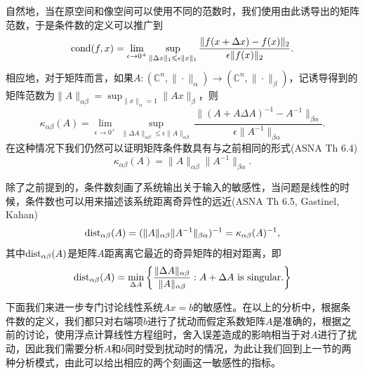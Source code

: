 \documentclass[a4paper,10pt]{ctexart}
\begin{document}
自然地，当在原空间和像空间可以使用不同的范数时，我们使用由此诱导出的矩阵范数，于是条件数的定义可以推广到
\begin{equation}
    {\rm cond}(f,x) = \lim_{\epsilon\to 0^+} \sup_{\| \Delta x \|_1\leqslant \epsilon \| x \|_1 }\frac{\| f(x+\Delta x) - f(x)\|_2 }{\epsilon \| f(x) \|_2}.
\end{equation}
相应地，对于矩阵而言，如果$ A: (\mathbb{C}^n, \| \cdot \|_\alpha )\to (\mathbb{C}^n, \| \cdot \|_\beta ) $，记诱导得到的矩阵范数为$ \| A \|_{\alpha \beta} = \sup_{\| x \|_\alpha = 1 } \| Ax \|_\beta $，则
\begin{equation}
    \kappa_{\alpha \beta}(A) = \lim_{\epsilon\to 0^+} \sup_{\| \Delta A \|_{\alpha \beta}\leqslant \epsilon \| A \|_{\alpha \beta} }\frac{\| (A+A\Delta A)^{-1} - A^{-1} \|_{\beta \alpha} }{\epsilon \| A^{-1} \|_{\beta \alpha} }.
\end{equation}
在这种情况下我们仍然可以证明矩阵条件数具有与之前相同的形式(ASNA Th 6.4)
\begin{equation}
    \kappa_{\alpha \beta}(A) = \| A \|_{\alpha \beta} \| A^{-1} \|_{\beta \alpha}.
\end{equation}

除了之前提到的，条件数刻画了系统输出关于输入的敏感性，当问题是线性的时候，条件数也可以用来描述该系统距离奇异性的远近(ASNA Th 6.5, Gastinel, Kahan)
\begin{equation}
    {\rm dist}_{\alpha \beta}(A) = (\| A \|_{\alpha \beta} \| A^{-1} \|_{\beta \alpha})^{-1} = \kappa_{\alpha \beta}(A)^{-1},
\end{equation}
其中$ {\rm dist}_{\alpha \beta}(A) $是矩阵$ A $距离离它最近的奇异矩阵的相对距离，即
\begin{equation}
    {\rm dist}_{\alpha \beta}(A) = \min_{\Delta A} \left\{ \frac{\| \Delta A \|_{\alpha \beta}}{\| A \|_{\alpha \beta} }:A+\Delta A \text{ is singular.} \right\}  
\end{equation}

下面我们来进一步专门讨论线性系统$ Ax=b $的敏感性。在以上的分析中，根据条件数的定义，我们都只对右端项$ b $进行了扰动而假定系数矩阵$ A $是准确的，根据之前的讨论，使用浮点计算线性方程组时，舍入误差造成的影响相当于对$ A $进行了扰动，因此我们需要分析$ A $和$ b $同时受到扰动时的情况，为此让我们回到上一节的两种分析模式，由此可以给出相应的两个刻画这一敏感性的指标。
\end{document}
